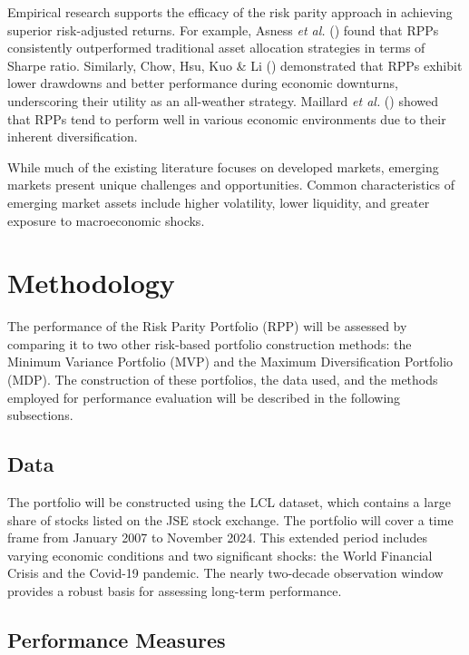 \documentclass[11pt,preprint]{elsarticle}
\numberwithin{equation}{section}
\numberwithin{figure}{section}
\numberwithin{table}{section}
\begin{document}
Empirical research supports the efficacy of the risk parity approach in
achieving superior risk-adjusted returns. For example, Asness \emph{et
al.} () found that RPPs
consistently outperformed traditional asset allocation strategies in
terms of Sharpe ratio. Similarly, Chow, Hsu, Kuo \& Li
() demonstrated that RPPs exhibit
lower drawdowns and better performance during economic downturns,
underscoring their utility as an all-weather strategy. Maillard \emph{et
al.} () showed that RPPs tend
to perform well in various economic environments due to their inherent
diversification.

While much of the existing literature focuses on developed markets,
emerging markets present unique challenges and opportunities. Common
characteristics of emerging market assets include higher volatility,
lower liquidity, and greater exposure to macroeconomic shocks.

\section{Methodology}\label{methodology}

The performance of the Risk Parity Portfolio (RPP) will be assessed by
comparing it to two other risk-based portfolio construction methods: the
Minimum Variance Portfolio (MVP) and the Maximum Diversification
Portfolio (MDP). The construction of these portfolios, the data used,
and the methods employed for performance evaluation will be described in
the following subsections.

\subsection{Data}\label{data}

The portfolio will be constructed using the LCL dataset, which contains
a large share of stocks listed on the JSE stock exchange. The portfolio
will cover a time frame from January 2007 to November 2024. This
extended period includes varying economic conditions and two significant
shocks: the World Financial Crisis and the Covid-19 pandemic. The nearly
two-decade observation window provides a robust basis for assessing
long-term performance.

\subsection{Performance Measures}\label{performance-measures}
\end{document}
